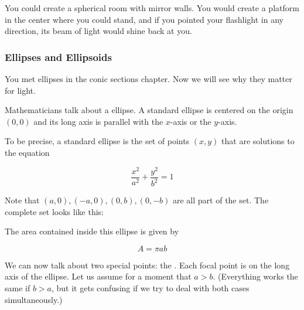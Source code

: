 You could create a spherical room with mirror walls. You would
create a platform in the center where you could stand, and if you
pointed your flashlight in any direction, its beam of light would
shine back at you.

\subsubsection{Ellipses and Ellipsoids}

You met ellipses in the conic sections chapter. Now we will see why they
matter for light.

Mathematicians talk about a  ellipse. A standard ellipse is
centered on the origin $(0,0)$ and its long axis is parallel with the
$x$-axis or the $y$-axis.

\begin{mdframed}[style=important, frametitle={Equation for a Standard Ellipse}]

  To be precise, a standard ellipse is the set of points $(x, y)$ that
  are solutions to the equation

  $$\frac{x^2}{a^2} + \frac{y^2}{b^2} = 1$$


  Note that $(a,0), (-a, 0), (0, b), (0,-b)$ are all part of the
  set. The complete set looks like this:


  The area contained inside this ellipse is given by

  $$A = \pi a b$$


\end{mdframed}


We can now talk about two special points: the . Each
focal point is on the long axis of the ellipse. Let us assume for a
moment that $a > b$. (Everything works the same if $b > a$, but it
gets confusing if we try to deal with both cases simultaneously.)

